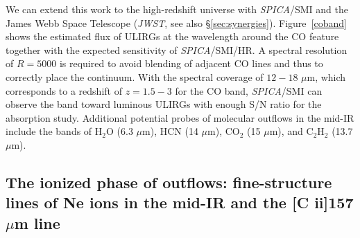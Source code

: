 \documentclass{pasa}%
\begin{document}
We can extend this work to the high-redshift universe with {\it SPICA}/SMI and
the James Webb Space Telescope ({\it JWST}, see also
  \S\ref{sec:synergies}). 
Figure~\ref{coband} shows the estimated flux of ULIRGs at the
wavelength around the CO feature together with the expected sensitivity of
{\it SPICA}/SMI/HR. A spectral resolution of $R=5000$ is required to avoid
blending of adjacent CO lines and thus to correctly place the continuum. With
the spectral coverage of $12-18$ $\mu$m, which corresponds to a redshift of 
$z= 1.5-3$ for the CO band, {\it SPICA}/SMI can observe the band toward
luminous ULIRGs with enough S/N ratio for the absorption study. 
Additional potential probes of molecular
outflows in the mid-IR include the bands of H$_2$O ($6.3$ $\mu$m), HCN (14
$\mu$m), CO$_2$ (15 $\mu$m), and C$_2$H$_2$ (13.7 $\mu$m).
 



\subsection{The ionized phase of outflows: fine-structure lines of Ne ions in
  the mid-IR and the [C {\sc ii}]157$\mu$m line} 
\label{sec:ion}

\end{document}
